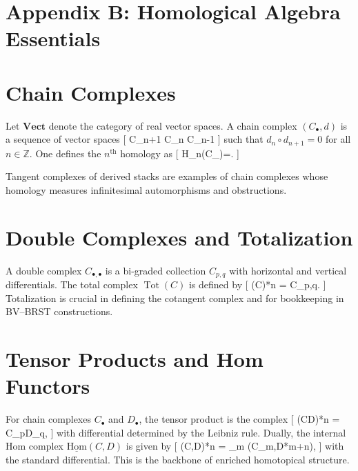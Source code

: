 \section*{Appendix B: Homological Algebra Essentials}

\section{Chain Complexes}

Let $\mathbf{Vect}$ denote the category of real vector spaces. A chain complex $(C_\bullet,d)$ is a sequence of vector spaces
[
\cdots \longrightarrow C_{n+1} C_n C_{n-1}\longrightarrow\cdots
]
such that $d_n\circ d_{n+1}=0$ for all $n\in\mathbb{Z}$.  One defines the $n^{\mathrm{th}}$ homology as
[
H_n(C_\bullet)=.
]

\begin{remark}
Tangent complexes of derived stacks are examples of chain complexes whose homology measures infinitesimal automorphisms and obstructions.
\end{remark}

\section{Double Complexes and Totalization}

A double complex $C_{\bullet,\bullet}$ is a bi-graded collection ${C_{p,q}}$ with horizontal and vertical differentials. The total complex $\operatorname{Tot}(C)$ is defined by
[
(C)*n =  C_{p,q}.
]
Totalization is crucial in defining the cotangent complex and for bookkeeping in BV--BRST constructions.

\section{Tensor Products and Hom Functors}

For chain complexes $C_\bullet$ and $D_\bullet$, the tensor product is the complex
[
(C\otimes D)*n =  C_p\otimes D_q,
]
with differential determined by the Leibniz rule.  Dually, the internal Hom complex $\underline{\mathrm{Hom}}(C,D)$ is given by
[
\underline{}(C,D)*n = \prod_m (C_m,D*{m+n}),
]
with the standard differential. This is the backbone of enriched homotopical structure.

